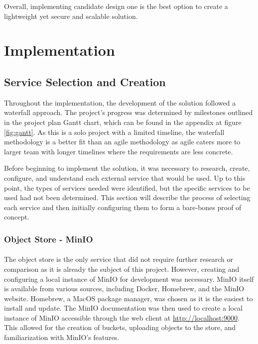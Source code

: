 \documentclass[12pt, conference, final, a4paper, onecolumn, compsoc]{IEEEtran}
\begin{document}
Overall, implementing candidate design one is the best option to create a
lightweight yet secure and scalable solution.

\section{Implementation}

\subsection*{Service Selection and Creation}


Throughout the implementation, the development of the solution followed a
waterfall approach. The project's progress was determined by milestones outlined
in the project plan Gantt chart, which can be found in the appendix at figure
\ref{fig:gantt}. As this is a solo project with a limited timeline, the
waterfall methodology is a better fit than an agile methodology as agile caters
more to larger team with longer timelines where the requirements are less concrete.

Before beginning to implement the solution, it was necessary to
research, create, configure, and understand each external service that would be
used. Up to this point, the types of services needed were identified, but the
specific services to be used had not been determined. This section will describe
the process of selecting each service and then initially configuring them to
form a bare-bones proof of concept.

\subsubsection*{Object Store - MinIO}
\paragraph{}

The object store is the only service that did not require further research or
comparison as it is already the subject of this project. However, creating and
configuring a local instance of MinIO for development was necessary. MinIO
itself is available from various sources, including Docker, Homebrew, and the
MinIO website. Homebrew, a MacOS package manager, was chosen as it is the
easiest to install and update. The MinIO documentation was then used to create a
local instance of MinIO accessible through the web client
at \url{http://localhost:9000}. This allowed for the creation of buckets,
uploading objects to the store, and familiarization with MinIO's features.
\end{document}
